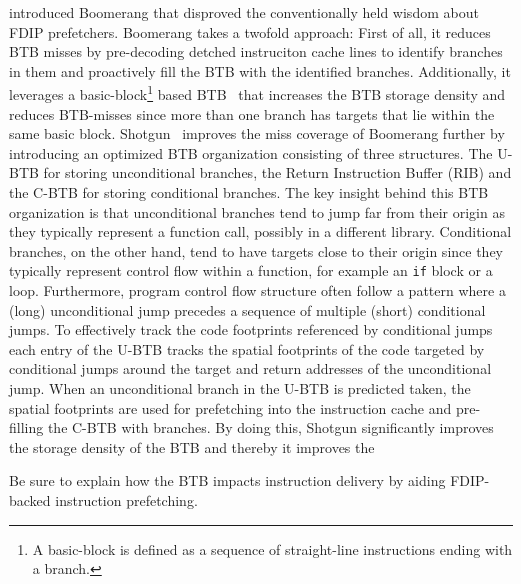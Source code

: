 \documentclass[../main.tex]{subfiles}
\begin{document}
\begin{refsection}
\textcite{kumar17_boomer} introduced Boomerang that disproved the
conventionally held wisdom about FDIP prefetchers. Boomerang takes a
twofold approach: First of all, it reduces BTB misses by pre-decoding
detched instruciton cache lines to identify branches in them and
proactively fill the BTB with the identified branches. Additionally,
it leverages a basic-block\footnote{A basic-block is defined as a
  sequence of straight-line instructions ending with a branch.} based
BTB~\cite{yeh92_compr_instr_fetch_mechan_for} that increases the BTB
storage density and reduces BTB-misses since more than one branch has
targets that lie within the same basic
block. Shotgun~\cite{kumar18_blast_throug_front_end_bottl_with_shotg,kumar20_shoot_down_server_front_end_bottl}
improves the miss coverage of Boomerang further by introducing an
optimized BTB organization consisting of three structures. The U-BTB
for storing unconditional branches, the Return Instruction Buffer
(RIB) and the C-BTB for storing conditional branches. The key insight
behind this BTB organization is that unconditional branches tend to
jump far from their origin as they typically represent a function
call, possibly in a different library. Conditional branches, on the
other hand, tend to have targets close to their origin since they
typically represent control flow within a function, for example an
\texttt{if} block or a loop. Furthermore, program control flow structure often follow a pattern where a (long) unconditional jump precedes a sequence of multiple (short) conditional jumps. To effectively track the code footprints referenced by conditional jumps each entry of the U-BTB tracks the spatial footprints of the code targeted by conditional jumps around the target and return addresses of the unconditional jump. When an unconditional branch in the U-BTB is predicted taken, the spatial footprints are used for prefetching into the instruction cache and pre-filling the C-BTB with branches. By doing this, Shotgun significantly improves the storage density of the BTB and thereby it improves the 



Be sure to explain how the BTB impacts instruction delivery by aiding FDIP-backed instruction prefetching.






\end{refsection}
\end{document}
